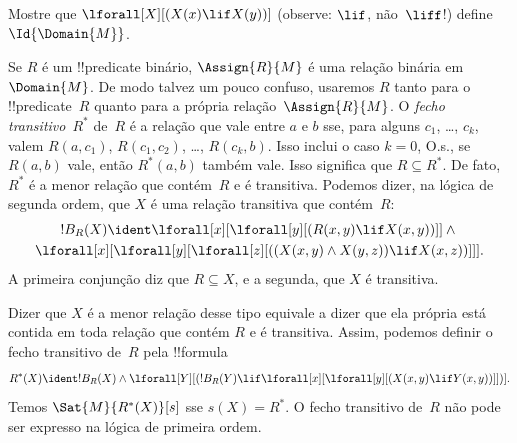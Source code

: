 \documentclass[../../../include/open-logic-section]{subfiles}
\begin{document}
\begin{prob}
Mostre que $\lforall[X][(X(x) \lif X(y))]$ (observe:
$\lif$, não~$\liff$!) define $\Id{\Domain{M}}$.
\end{prob}

\begin{ex}
Se $R$ é um !!{predicate} binário, $\Assign{R}{M}$ é uma relação binária
em~$\Domain{M}$. De modo talvez um pouco confuso, usaremos $R$ tanto para o
!!{predicate}~$R$ quanto para a própria relação~$\Assign{R}{M}$. O
\emph{fecho transitivo}~$R^*$ de~$R$ é a relação que vale entre $a$ e $b$
sse, para alguns $c_1$, \dots, $c_k$, valem $R(a,c_1)$, $R(c_1, c_2)$,
\dots, $R(c_k,b)$. Isso inclui o caso $k = 0$, O.s.\@, se $R(a,b)$ vale,
então $R^*(a,b)$ também vale. Isso significa que $R \subseteq R^*$. De
fato, $R^*$ é a menor relação que contém~$R$ e é transitiva. Podemos dizer,
na lógica de segunda ordem, que $X$ é uma relação transitiva que contém~$R$:
\begin{multline*}
  !B_R(X) \ident \lforall[x][\lforall[y][(R(x,y) \lif X(x, y))]] \land {}\\
\lforall[x][\lforall[y][\lforall[z][((X(x,y) \land X(y,z)) \lif X(x,
      z))]]].
\end{multline*}
A primeira conjunção diz que $R \subseteq X$, e a segunda, que $X$ é
transitiva.

Dizer que $X$ é a menor relação desse tipo equivale a dizer que ela própria
está contida em toda relação que contém $R$ e é transitiva. Assim, podemos
definir o fecho transitivo de~$R$ pela !!{formula}
\[
R^*(X) \ident !B_R(X) \land \lforall[Y][(!B_R(Y) \lif
  \lforall[x][\lforall[y][(X(x, y) \lif Y(x,y))]])].
\]
Temos $\Sat{M}{R^*(X)}[s]$ sse $s(X) = R^*$. O fecho transitivo de~$R$ não
pode ser expresso na lógica de primeira ordem.
\end{ex}
\end{document}
